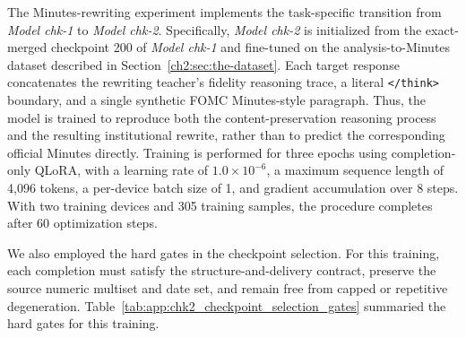 The Minutes-rewriting experiment implements the task-specific transition from
\textit{Model chk-1} to \textit{Model chk-2}. Specifically,
\textit{Model chk-2} is initialized from the exact-merged checkpoint 200 of
\textit{Model chk-1} and fine-tuned on the analysis-to-Minutes dataset described
in Section~\ref{ch2:sec:the-dataset}. Each target response concatenates the
rewriting teacher's fidelity reasoning trace, a literal \texttt{</think>}
boundary, and a single synthetic FOMC Minutes-style paragraph. Thus, the model
is trained to reproduce both the content-preservation reasoning process and the
resulting institutional rewrite, rather than to predict the corresponding
official Minutes directly. Training is performed for three epochs using
completion-only QLoRA, with a learning rate of $1.0\times10^{-6}$, a maximum
sequence length of 4,096 tokens, a per-device batch size of 1, and gradient
accumulation over 8 steps. With two training devices and 305 training samples,
the procedure completes after 60 optimization steps.



We also employed the hard gates in the checkpoint selection. For this training, each completion must satisfy the structure-and-delivery contract, preserve the source numeric multiset and date set, and remain free from capped or repetitive degeneration. Table~\ref{tab:app:chk2_checkpoint_selection_gates} summaried the hard gates for this training.


